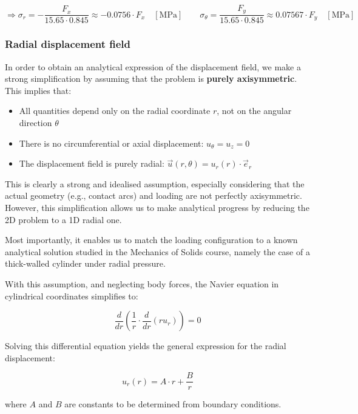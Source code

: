 \documentclass[12pt]{article}
\begin{document}
\[
\Rightarrow
\sigma_r = -\frac{F_x}{15.65 \cdot 0.845} \approx \boxed{-0.0756 \cdot F_x} \quad [\text{MPa}]
\qquad
\sigma_\theta = \frac{F_y}{15.65 \cdot 0.845}  \approx \boxed{0.07567 \cdot F_y} \quad [\text{MPa}]
\]

\subsubsection{Radial displacement field}

In order to obtain an analytical expression of the displacement field, we make a strong simplification by assuming that the problem is \textbf{purely axisymmetric}. This implies that:

\begin{itemize}
    \item All quantities depend only on the radial coordinate \( r \), not on the angular direction \( \theta \)
    \item There is no circumferential or axial displacement: \( u_\theta = u_z = 0 \)
    \item The displacement field is purely radial: \( \vec{u}(r, \theta) = u_r(r) \cdot \vec{e}_r \)
\end{itemize}

\vspace{0.5em}

This is clearly a strong and idealised assumption, especially considering that the actual geometry (e.g., contact arcs) and loading are not perfectly axisymmetric. However, this simplification allows us to make analytical progress by reducing the 2D problem to a 1D radial one. 

Most importantly, it enables us to match the loading configuration to a known analytical solution studied in the Mechanics of Solids course, namely the case of a thick-walled cylinder under radial pressure.

\vspace{0.5em}

With this assumption, and neglecting body forces, the Navier equation in cylindrical coordinates simplifies to:

\[
\frac{d}{dr} \left( \frac{1}{r} \cdot \frac{d}{dr}(r u_r) \right) = 0
\]

Solving this differential equation yields the general expression for the radial displacement:

\[
u_r(r) = A \cdot r + \frac{B}{r}
\]

where \( A \) and \( B \) are constants to be determined from boundary conditions.
\end{document}
